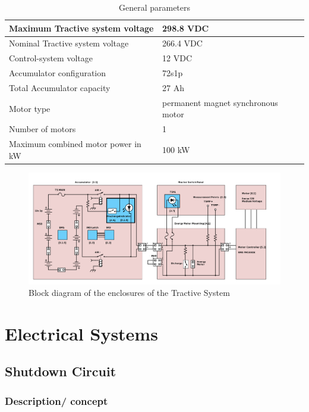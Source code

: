 \documentclass{article}
\begin{document}
	\begin{table}[H]
        \centering
        \begin{tabular}{|l|l|}
        \hline
            Maximum Tractive system voltage & 298.8 VDC \\ \hline
            Nominal Tractive system voltage & 266.4 VDC \\ \hline
            Control-system voltage & 12 VDC \\ \hline
            Accumulator configuration & 72s1p \\ \hline
            Total Accumulator capacity & 27 Ah \\ \hline
            Motor type & permanent magnet synchronous motor \\ \hline
            Number of motors & 1 \\ \hline
            Maximum combined motor power in kW & 100 kW \\ \hline
        \end{tabular}
        \caption{General parameters}
        \label{systemtable}
  \end{table}

  \begin{figure}[H]
  \centering
  \includegraphics[width = 0.9 \textwidth]{TS-Block-Diagram.png}
  \caption{Block diagram of the enclosures of the Tractive System}
  \label{fig:TS_block_diagram}
  \end{figure}


\section{Electrical Systems}\label{electrical_systems}

\subsection{Shutdown Circuit}\label{shutdown_circuit}

\subsubsection{Description/ concept}
\end{document}
